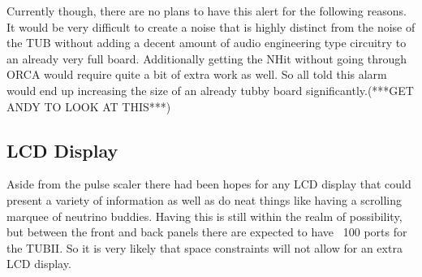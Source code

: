 \documentclass[11pt,a4paper]{article}
\begin{document}
Currently though, there are no plans to have this alert for the following reasons. It would be very difficult to create a noise that is highly distinct from the noise of the TUB without adding a decent amount of audio engineering type circuitry to an already very full board. Additionally getting the NHit without going through ORCA would require quite a bit of extra work as well. So all told this alarm would end up increasing the size of an already tubby board significantly.(***GET ANDY TO LOOK AT THIS***)

\subsection{LCD Display}
Aside from the pulse scaler there had been hopes for any LCD display that could present a variety of information as well as do neat things like having a scrolling marquee of neutrino buddies. Having this is still within the realm of possibility, but between the front and back panels there are expected to have ~100 ports for the TUBII. So it is very likely that space constraints will not allow for an extra LCD display.
\end{document}
